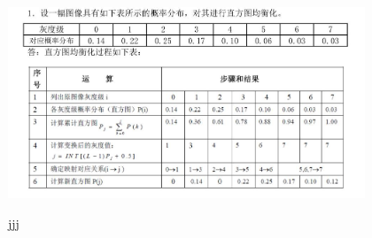 \documentclass{article}
\begin{document}
\begin{CJK}{UTF8}{gbsn}
{\centering
\includegraphics[width=0.8\textwidth,height=0.5\textwidth]{p3_key.jpg}}

jjj





\end{CJK}
\end{document}
